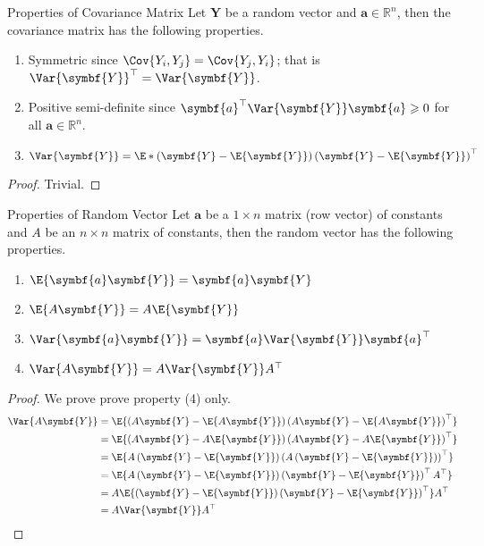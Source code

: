 \begin{Proposition}{Properties of Covariance Matrix}{}
    Let $ \symbf{Y} $ be a random vector and $ \symbf{a}\in\mathbb{R}^n $,
    then the covariance matrix has the following properties.
    \begin{enumerate}[label=(\arabic*)]
        \item Symmetric since $ \Cov{Y_i,Y_j}=\Cov{Y_j,Y_i} $; that is $ \Var{\symbf{Y}}^\top=\Var{\symbf{Y}} $.
        \item Positive semi-definite since
              $ \symbf{a}^\top\Var{\symbf{Y}}\symbf{a}\geqslant 0 $
              for all $ \symbf{a}\in\mathbb{R}^n $.
        \item $ \Var{\symbf{Y}}=
                  \E*{\left( \symbf{Y}-\E{\symbf{Y}} \right)\left( \symbf{Y}-\E{\symbf{Y}} \right)^\top} $
    \end{enumerate}
\end{Proposition}
\begin{proof}
    Trivial.
\end{proof}
\begin{Proposition}{Properties of Random Vector}
    Let $ \symbf{a} $ be a $ 1\times n $ matrix (row vector)
    of constants and $ A $ be an $ n\times n $ matrix of constants, then
    the random vector has the following properties.
    \begin{enumerate}[label=(\arabic*)]
        \item $ \E{\symbf{a}\symbf{Y}}=\symbf{a}\symbf{Y} $
        \item $ \E{A\symbf{Y}}=A\E{\symbf{Y}} $
        \item $ \Var{\symbf{a}\symbf{Y}}=\symbf{a}\Var{\symbf{Y}}\symbf{a}^\top $
        \item $ \Var{A\symbf{Y}}=A\Var{\symbf{Y}}A^\top $
    \end{enumerate}
\end{Proposition}
\begin{proof}
    We prove prove property (4) only.
    \begin{align*}
        \Var{A\symbf{Y}}
         & =\E{\left(A\symbf{Y}-\E{A\symbf{Y}}\right)
        \left(A\symbf{Y}-\E{A\symbf{Y}}\right)^\top}                                                     \\
         & =\E{\left( A\symbf{Y}-A\E{\symbf{Y}} \right)
        \left( A\symbf{Y}-A\E{\symbf{Y}} \right)^\top}                                                   \\
         & =\E{A\left( \symbf{Y}-\E{\symbf{Y}} \right)
        \left( A\left( \symbf{Y}-\E{\symbf{Y}} \right) \right)^\top}                                     \\
         & =\E{A\left( \symbf{Y}-\E{\symbf{Y}} \right)
        \left( \symbf{Y}-\E{\symbf{Y}} \right)^\top A^\top}                                              \\
         & =A\E{\left( \symbf{Y}-\E{\symbf{Y}} \right)\left( \symbf{Y}-\E{\symbf{Y}} \right)^\top}A^\top \\
         & =A\Var{\symbf{Y}}A^\top
    \end{align*}
\end{proof}
